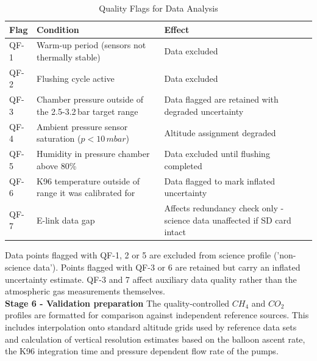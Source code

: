 \begin{table}[H]
\centering
\caption{Quality Flags for Data Analysis}
\label{tab:data-analysis-qf}
\begin{tabular}{p{1cm}p{5cm}p{5cm}}
\hline
Flag & Condition & Effect\\
\hline
QF-1 & Warm-up period (sensors not thermally stable) & Data excluded \\
QF-2 & Flushing cycle active &  Data excluded \\
QF-3 & Chamber pressure outside of the 2.5-3.2\,bar target range & Data flagged are retained with degraded uncertainty\\
QF-4 & Ambient pressure sensor saturation ($p<10\,mbar$) & Altitude assignment degraded \\
QF-5 & Humidity in pressure chamber above 80\% & Data excluded until flushing completed \\
QF-6 & K96 temperature outside of range it was calibrated for & Data flagged to mark inflated uncertainty\\  
QF-7 & E-link data gap & Affects redundancy check only - science data unaffected if SD card intact \\ 
\hline
\end{tabular}
\end{table}

Data points flagged with QF-1, 2 or 5 are excluded from science profile ('non-science data'). Points flagged with QF-3 or 6 are retained but carry an inflated uncertainty estimate. QF-3 and 7 affect auxiliary data quality rather than the atmospheric gas measurements themselves.\\
\textbf{Stage 6 - Validation preparation} The quality-controlled $CH_4$ and $CO_2$ profiles are formatted for comparison against independent reference sources. This includes interpolation onto standard altitude grids used by reference data sets and calculation of vertical resolution estimates based on the balloon ascent rate, the K96 integration time and pressure dependent flow rate of the pumps.

